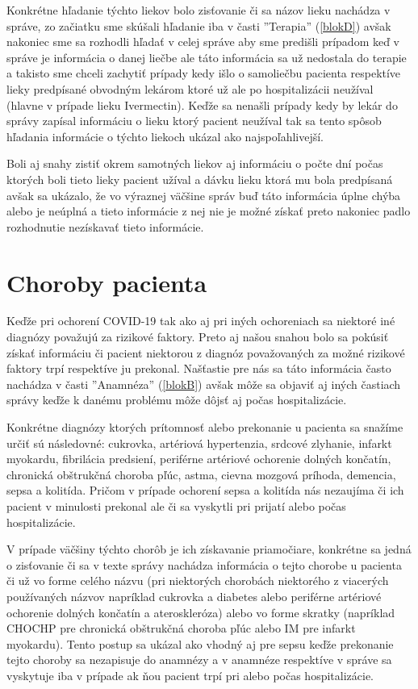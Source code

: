 Konkrétne hľadanie týchto liekov bolo zisťovanie či sa názov lieku nachádza v správe, zo začiatku sme skúšali hľadanie iba v časti ''Terapia'' (\ref{blokD}) avšak nakoniec sme sa rozhodli hľadať v celej správe aby sme predišli prípadom keď v správe je informácia o danej liečbe ale táto informácia sa už nedostala do terapie a takisto sme chceli zachytiť prípady kedy išlo o samoliečbu pacienta respektíve lieky predpísané obvodným lekárom ktoré už ale po hospitalizácii neužíval (hlavne v prípade lieku Ivermectin). Keďže sa nenašli prípady kedy by lekár do správy zapísal informáciu o lieku ktorý pacient neužíval tak sa tento spôsob hľadania informácie o týchto liekoch ukázal ako najspoľahlivejší.
 
Boli aj snahy zistiť okrem samotných liekov aj informáciu o počte dní počas ktorých boli tieto lieky pacient užíval a dávku lieku ktorá mu bola predpísaná avšak sa ukázalo, že vo výraznej väčšine správ buď táto informácia úplne chýba alebo je neúplná a tieto informácie z nej nie je možné získať preto nakoniec padlo rozhodnutie nezískavať tieto informácie.

\section{Choroby pacienta}
\label{choroby}
Keďže pri ochorení COVID-19 tak ako aj pri iných ochoreniach sa niektoré iné diagnózy považujú za rizikové faktory. Preto aj našou snahou bolo sa pokúsiť získať informáciu či pacient niektorou z diagnóz považovaných za možné rizikové faktory trpí respektíve ju prekonal. Našťastie pre nás sa táto informácia často nachádza v časti ''Anamnéza'' (\ref{blokB}) avšak môže sa objaviť aj iných častiach správy keďže k danému problému môže dôjsť aj počas hospitalizácie.

Konkrétne diagnózy ktorých prítomnosť alebo prekonanie u pacienta sa snažíme určiť sú následovné: cukrovka, artériová hypertenzia, srdcové zlyhanie, infarkt myokardu, fibrilácia predsiení, periférne artériové ochorenie dolných končatín, chronická obštrukčná choroba pľúc, astma, cievna mozgová príhoda, demencia, sepsa a kolitída. Pričom v prípade ochorení sepsa a kolitída nás nezaujíma či ich pacient v minulosti prekonal ale či sa vyskytli pri prijatí alebo počas hospitalizácie.

V prípade väčšiny týchto chorôb je ich získavanie priamočiare, konkrétne sa jedná o zisťovanie či sa v texte správy nachádza informácia o tejto chorobe u pacienta či už vo forme celého názvu (pri niektorých chorobách niektorého z viacerých používaných názvov napríklad cukrovka a diabetes alebo periférne artériové ochorenie dolných končatín a ateroskleróza) alebo vo forme skratky (napríklad CHOCHP pre chronická obštrukčná choroba pľúc alebo IM pre infarkt myokardu). Tento postup sa ukázal ako vhodný aj pre sepsu keďže prekonanie tejto choroby sa nezapisuje do anamnézy a v anamnéze respektíve v správe sa vyskytuje iba v prípade ak ňou pacient trpí pri alebo počas hospitalizácie.

